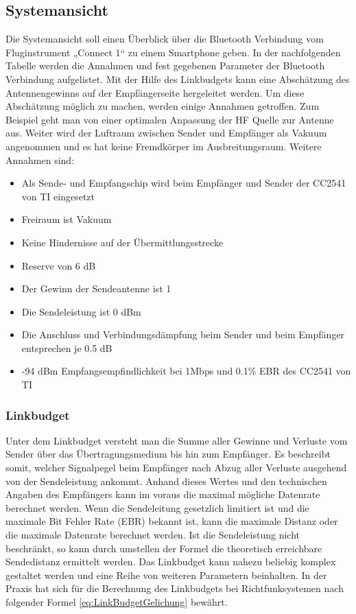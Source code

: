 \subsection{Systemansicht}
Die Systemansicht soll einen Überblick über die Bluetooth Verbindung vom Fluginstrument „Connect 1“ zu einem Smartphone geben.
In der nachfolgenden Tabelle werden die Annahmen und fest gegebenen Parameter der Bluetooth Verbindung aufgelistet. Mit der Hilfe des Linkbudgets kann eine Abschätzung des Antennengewinns auf der Empfängerseite hergeleitet werden. Um diese Abschätzung möglich zu machen, werden einige Annahmen getroffen. Zum Beispiel geht man von einer optimalen Anpassung der HF Quelle zur Antenne aus. Weiter wird der Luftraum zwischen Sender und Empfänger als Vakuum angenommen und es hat keine Fremdkörper im Ausbreitungsraum.
Weitere Annahmen sind:
\begin{itemize}
\item Als Sende- und Empfangschip wird beim Empfänger und Sender der CC2541 von TI eingesetzt
\item Freiraum ist Vakuum
\item Keine Hindernisse auf der Übermittlungsstrecke
\item Reserve von 6 dB

\item Der Gewinn der Sendeantenne ist 1
\item Die Sendeleistung ist 0 dBm
\item Die Anschluss und Verbindungsdämpfung beim Sender und beim Empfänger entsprechen je 0.5 dB
\item -94 dBm Empfangsempfindlichkeit bei 1Mbps und 0.1\% EBR des CC2541 von TI
\end{itemize}

\subsubsection{Linkbudget}
Unter dem Linkbudget versteht man die Summe aller Gewinne und Verluste vom Sender über das Übertragungsmedium bis hin zum Empfänger. Es beschreibt somit, welcher Signalpegel beim Empfänger nach Abzug aller Verluste ausgehend von der Sendeleistung ankommt. Anhand dieses Wertes und den technischen Angaben des Empfängers kann im voraus die maximal mögliche Datenrate berechnet werden. Wenn die Sendeleitung gesetzlich limitiert ist und die maximale Bit Fehler Rate (EBR) bekannt ist, kann die maximale Distanz oder die maximale Datenrate berechnet werden. Ist die Sendeleistung nicht beschränkt, so kann durch umstellen der Formel die theoretisch erreichbare Sendedistanz ermittelt werden. 
Das Linkbudget kann  nahezu beliebig komplex gestaltet werden und eine  Reihe von weiteren Parametern beinhalten. In der Praxis hat sich für die Berechnung des Linkbudgets bei Richtfunksystemen nach folgender Formel \ref{eq:LinkBudgetGelichung} bewährt.


